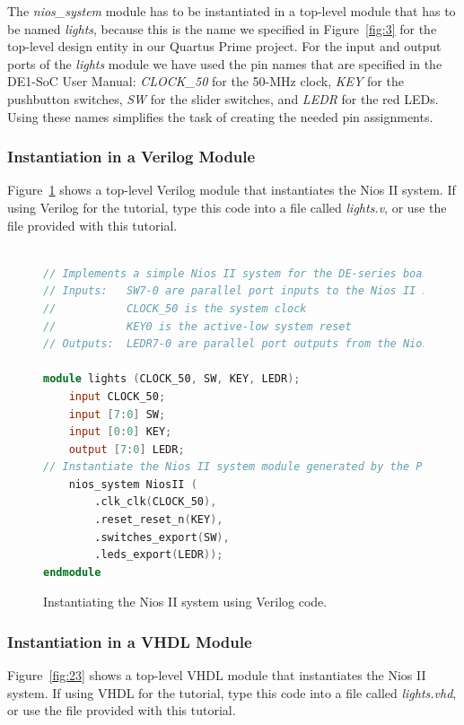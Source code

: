 \documentclass[11pt, twoside, pdftex]{article}
\begin{document}
The {\it nios\_system} module has to be instantiated in a top-level module that has to be
named {\it lights}, because this is the name we specified
in Figure~\ref{fig:3} for the top-level design entity in our Quartus Prime project.
For the input and output ports of the {\it lights} module we have used the pin names
that are specified in the DE1-SoC User Manual: 
{\it CLOCK\_50} for the 50-MHz clock,  {\it KEY} for the pushbutton switches,
{\it SW} for the slider switches, and {\it LEDR} for the red LEDs.
Using these names simplifies the task of creating the needed pin assignments.

\newpage
\subsubsection{Instantiation in a Verilog Module}
Figure~\ref{fig:22} shows a top-level Verilog module that instantiates the Nios II system.
If using Verilog for the tutorial, 
type this code into a file called {\it lights.v}, or use the file provided with this tutorial.

\begin{figure}[H]
\begin{center}
\begin{lstlisting}[language=Verilog]

// Implements a simple Nios II system for the DE-series board.
// Inputs:   SW7-0 are parallel port inputs to the Nios II system
//           CLOCK_50 is the system clock
//           KEY0 is the active-low system reset
// Outputs:  LEDR7-0 are parallel port outputs from the Nios II system

module lights (CLOCK_50, SW, KEY, LEDR);
    input CLOCK_50;
    input [7:0] SW;
    input [0:0] KEY;
    output [7:0] LEDR;
// Instantiate the Nios II system module generated by the Platform Designer tool:
    nios_system NiosII (
        .clk_clk(CLOCK_50),
        .reset_reset_n(KEY),
        .switches_export(SW),
        .leds_export(LEDR));
endmodule

\end{lstlisting}
\end{center}
	\caption{Instantiating the Nios II system using Verilog code.}
	\label{fig:22}
\end{figure}

\newpage
\subsubsection{Instantiation in a VHDL Module}
Figure~\ref{fig:23} shows a top-level VHDL module that instantiates the Nios II system.
If using VHDL for the tutorial, 
type this code into a file called {\it lights.vhd}, or use the file provided with this tutorial.
  
\end{document}
